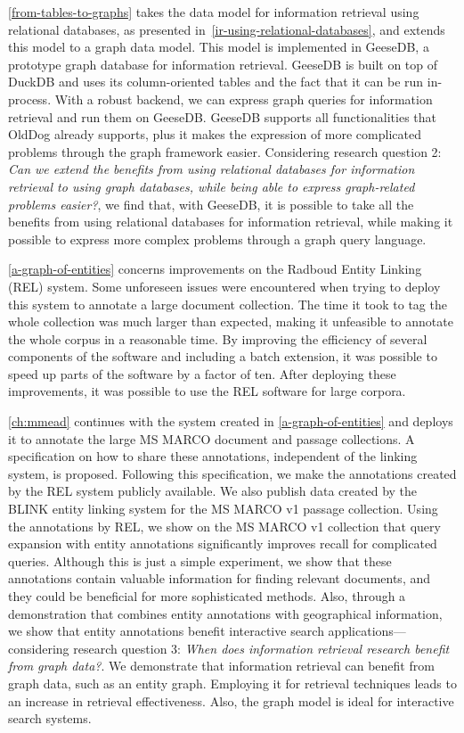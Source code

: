 \cref{from-tables-to-graphs} takes the data model for information retrieval using relational databases, as presented in~\cref{ir-using-relational-databases}, and extends this model to a graph data model. This model is implemented in GeeseDB, a prototype graph database for information retrieval. GeeseDB is built on top of DuckDB and uses its column-oriented tables and the fact that it can be run in-process. With a robust backend, we can express graph queries for information retrieval and run them on GeeseDB. GeeseDB supports all functionalities that OldDog already supports, plus it makes the expression of more complicated problems through the graph framework easier. Considering research question 2: \emph{Can we extend the benefits from using relational databases for information retrieval to using graph databases, while being able to express graph-related problems easier?}, we find that, with GeeseDB, it is possible to take all the benefits from using relational databases for information retrieval, while making it possible to express more complex problems through a graph query language.

\cref{a-graph-of-entities} concerns improvements on the Radboud Entity Linking (REL) system. Some unforeseen issues were encountered when trying to deploy this system to annotate a large document collection. The time it took to tag the whole collection was much larger than expected, making it unfeasible to annotate the whole corpus in a reasonable time. By improving the efficiency of several components of the software and including a batch extension, it was possible to speed up parts of the software by a factor of ten. After deploying these improvements, it was possible to use the REL software for large corpora. 

\cref{ch:mmead} continues with the system created in \cref{a-graph-of-entities} and deploys it to annotate the large MS MARCO document and passage collections. A specification on how to share these annotations, independent of the linking system, is proposed. Following this specification, we make the annotations created by the REL system publicly available. We also publish data created by the BLINK entity linking system for the MS MARCO v1 passage collection. Using the annotations by REL, we show on the MS MARCO v1 collection that query expansion with entity annotations significantly improves recall for complicated queries. Although this is just a simple experiment, we show that these annotations contain valuable information for finding relevant documents, and they could be beneficial for more sophisticated methods. Also, through a demonstration that combines entity annotations with geographical information, we show that entity annotations benefit interactive search applications—considering research question 3: \emph{When does information retrieval research benefit from graph data?}. We demonstrate that information retrieval can benefit from graph data, such as an entity graph. Employing it for retrieval techniques leads to an increase in retrieval effectiveness. Also, the graph model is ideal for interactive search systems. 

